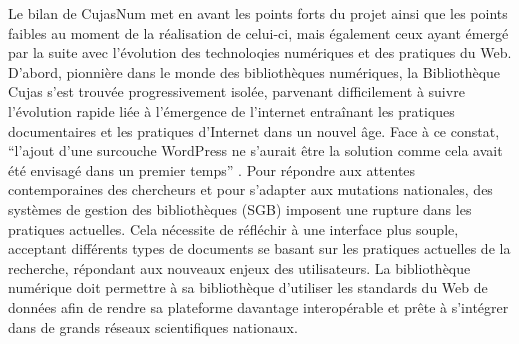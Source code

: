 Le bilan de CujasNum met en avant les points forts du projet ainsi que les points faibles au moment de la réalisation de celui-ci, mais également ceux ayant émergé par la suite avec l'évolution des technoloqies numériques et des pratiques du Web. D'abord, pionnière dans le monde des bibliothèques numériques, la Bibliothèque Cujas s'est trouvée progressivement isolée, parvenant difficilement à suivre l'évolution rapide liée à l'émergence de l'internet entraînant les pratiques documentaires et les pratiques d'Internet dans un nouvel âge. Face à ce constat, \enquote{l'ajout d'une surcouche WordPress ne s'aurait être la solution comme cela avait été envisagé dans un premier temps} . Pour répondre aux attentes contemporaines des chercheurs et pour s'adapter aux mutations nationales, des systèmes de gestion des bibliothèques (SGB) imposent une rupture dans les pratiques actuelles. Cela nécessite de réfléchir à une interface plus souple, acceptant différents types de documents se basant sur les pratiques actuelles de la recherche, répondant aux nouveaux enjeux des utilisateurs. La bibliothèque numérique doit permettre à sa bibliothèque d'utiliser les standards du Web de données afin de rendre sa plateforme davantage interopérable et prête à s'intégrer dans de grands réseaux scientifiques nationaux.